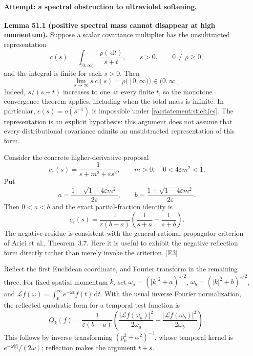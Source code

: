 \documentclass[11pt]{article}
\newcommand{\dd}{\,\mathrm d}
\newcommand{\eref}[2]{\hyperlink{extra:#1:#2}{[E#2]}}
\begin{document}
\paragraph{Attempt: a spectral obstruction to ultraviolet softening.}
\textbf{Lemma 51.1 (positive spectral mass cannot disappear at high
momentum).} Suppose a scalar covariance multiplier has the unsubtracted
representation
\begin{equation}\label{ra:statement:stieltjes}
 c(s)=\int_{[0,\infty)}\frac{\rho(\dd t)}{s+t},\qquad s>0,
 \qquad 0\ne\rho\ge0,
\end{equation}
and the integral is finite for each $s>0$. Then
\[
 \lim_{s\to\infty}s\,c(s)=\rho([0,\infty))\in(0,\infty].
\]
Indeed, $s/(s+t)$ increases to one at every finite $t$, so the monotone
convergence theorem applies, including when the total mass is infinite.
In particular, $c(s)=o(s^{-1})$ is impossible under
\eqref{ra:statement:stieltjes}. The representation is an explicit hypothesis:
this argument does not assume that every distributional covariance admits
an unsubtracted representation of this form.

Consider the concrete higher-derivative proposal
\[
 c_\varepsilon(s)=\frac{1}{s+m^2+\varepsilon s^2},\qquad
 m>0,\quad 0<4\varepsilon m^2<1.
\]
Put
\[
 a=\frac{1-\sqrt{1-4\varepsilon m^2}}{2\varepsilon},\qquad
 b=\frac{1+\sqrt{1-4\varepsilon m^2}}{2\varepsilon}.
\]
Then $0<a<b$ and the exact partial-fraction identity is
\begin{equation}\label{ra:statement:ghost}
 c_\varepsilon(s)=\frac{1}{\varepsilon(b-a)}
 \left(\frac{1}{s+a}-\frac{1}{s+b}\right).
\end{equation}
The negative residue is consistent with the general rational-propagator
criterion of Arici et al., Theorem~3.7. Here it is useful to exhibit the
negative reflection form directly rather than merely invoke the criterion.
\eref{statement}{3}

Reflect the first Euclidean coordinate, and Fourier transform in the
remaining three. For fixed spatial momentum $k$, set
$\omega_a=(|k|^2+a)^{1/2}$, $\omega_b=(|k|^2+b)^{1/2}$, and
$\mathcal Lf(\omega)=\int_0^\infty e^{-\omega t}f(t)\dd t$.
With the usual inverse Fourier normalization, the reflected quadratic form
for a temporal test function is
\begin{equation}\label{ra:statement:reflection}
 Q_k(f)=\frac{1}{\varepsilon(b-a)}
 \left(\frac{|\mathcal Lf(\omega_a)|^2}{2\omega_a}
       -\frac{|\mathcal Lf(\omega_b)|^2}{2\omega_b}\right).
\end{equation}
This follows by inverse transforming $(p_0^2+\omega^2)^{-1}$, whose temporal
kernel is $e^{-\omega|t|}/(2\omega)$; reflection makes the argument $t+s$.
\end{document}
